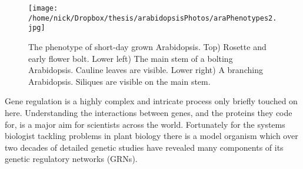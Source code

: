 \begin{figure*}[!hp]%
  \centering
    \texttt{[image: /home/nick/Dropbox/thesis/arabidopsisPhotos/araPhenotypes2.jpg]}
\caption{The phenotype of short-day grown Arabidopsis.
  Top) Rosette and early flower bolt.
  Lower left) The main stem of a bolting Arabidopsis.
  Cauline leaves are visible.
  Lower right) A branching Arabidopsis.
  Siliques are visible on the main stem.}%
\label{fig:ara}%
\end{figure*}
Gene regulation is a highly complex and intricate process only briefly touched on here.
Understanding the interactions between genes, and the proteins they code for, is a major aim for scientists across the world.
Fortunately for the systems biologist tackling problems in plant biology there is a model organism which over two decades of detailed genetic studies have revealed many components of its genetic regulatory networks (GRNs).

